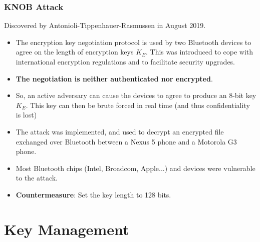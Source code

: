 \documentclass[12pt,titlepage]{article}
\let\stdsection\section
\renewcommand\section{\clearpage\stdsection}
\begin{document}
\subsubsection{KNOB Attack}
Discovered by Antonioli-Tippenhauer-Rasmussen in August 2019. 
\begin{itemize}
	\item The encryption key negotiation protocol is used by two Bluetooth devices to agree on the length of encryption keys $K_E$. This was introduced to cope with international encryption regulations and to facilitate security upgrades.
	\item \textbf{The negotiation is neither authenticated nor encrypted}.
	\item So, an active adversary can cause the devices to agree to produce an 8-bit key $K_E$. This key can then be brute forced in real time (and thus confidentiality is lost)
	\item The attack was implemented, and used to decrypt an encrypted file exchanged over Bluetooth between a Nexus 5 phone and a Motorola G3 phone.
	\item Most Bluetooth chips (Intel, Broadcom, Apple...) and devices were vulnerable to the attack.
	\item \textbf{Countermeasure}: Set the key length to 128 bits.
\end{itemize}

\section{Key Management}
\end{document}
